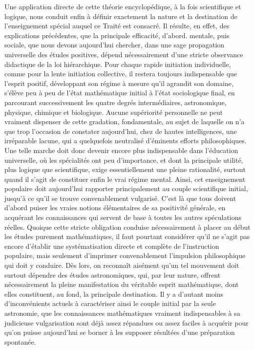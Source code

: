 \documentclass[french,twoside]{book} %
\begin{document}
Une application directe de cette théorie encyclopédique, à la fois scientifique et logique, nous conduit enfin à définir exactement la nature et la destination de l’enseignement spécial auquel ce Traité est consacré. Il résulte, en effet, des explications précédentes, que la principale efficacité, d’abord. mentale, puis sociale, que nous devons aujourd’hui chercher, dans une sage propagation universelle des études positives, dépend nécessairement d’une stricte observance didactique de la loi hiérarchique. Pour chaque rapide initiation individuelle, comme pour la lente initiation collective, il restera toujours indispensable que l’esprit positif, développant son régime à mesure qu’il agrandit son domaine, s’élève peu à peu de l’état mathématique initial à l’état sociologique final, en parcourant successivement les quatre degrés intermédiaires, astronomique, physique, chimique et biologique. Aucune supériorité personnelle ne peut vraiment dispenser de cette gradation, fondamentale, au sujet de laquelle on n’a que trop l’occasion de constater aujourd’hui, chez de hautes intelligences, une irréparable lacune, qui a quelquefois neutralisé d’éminents efforts philosophiques. Une telle marche doit donc devenir encore plus indispensable dans l’éducation universelle, où les spécialités ont peu d’importance, et dont la principale utilité, plus logique que scientifique, exige essentiellement une pleine rationalité, surtout quand il s’agit de constituer enfin le vrai régime mental. Ainsi, cet enseignement populaire doit aujourd’hui rapporter principalement au couple scientifique initial, jusqu’à ce qu’il se trouve convenablement vulgarisé. C’est là que tous doivent d’abord puiser les vraies notions élémentaires de sa positivité générale, en acquérant les connaissances qui servent de base à toutes les autres spéculations réelles. Quoique cette stricte obligation conduise nécessairement à placer au début les études purement mathématiques, il faut pourtant considérer qu’il ne s’agit pas encore d’établir une systématisation directe et complète de l’instruction populaire, mais seulement d’imprimer convenablement l’impulsion philosophique qui doit y conduire. Dès lors, on reconnaît aisément qu’un tel mouvement doit surtout dépendre des études astronomiques, qui, par leur nature, offrent nécessairement la pleine manifestation du véritable esprit mathématique, dont elles constituent, au fond, la principale destination. Il y a d’autant moins d’inconvénients actuels à caractériser ainsi le couple initial par la seule astronomie, que les connaissances mathématiques vraiment indispensables à sa judicieuse vulgarisation sont déjà assez répandues ou assez faciles à acquérir pour qu’on puisse aujourd’hui se borner à les supposer résultées d’une préparation spontanée.\par
\end{document}
